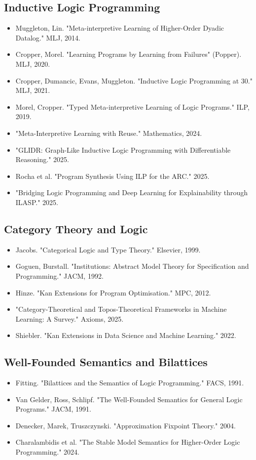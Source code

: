 \documentclass[11pt]{article}
\begin{document}
\subsection{Inductive Logic Programming}
\label{sec:orgf1f89b5}
\begin{itemize}
\item Muggleton, Lin. "Meta-interpretive Learning of Higher-Order Dyadic Datalog." MLJ, 2014.
\item Cropper, Morel. "Learning Programs by Learning from Failures" (Popper). MLJ, 2020.
\item Cropper, Dumancic, Evans, Muggleton. "Inductive Logic Programming at 30." MLJ, 2021.
\item Morel, Cropper. "Typed Meta-interpretive Learning of Logic Programs." ILP, 2019.
\item "Meta-Interpretive Learning with Reuse." Mathematics, 2024.
\item "GLIDR: Graph-Like Inductive Logic Programming with Differentiable Reasoning." 2025.
\item Rocha et al. "Program Synthesis Using ILP for the ARC." 2025.
\item "Bridging Logic Programming and Deep Learning for Explainability through ILASP." 2025.
\end{itemize}
\subsection{Category Theory and Logic}
\label{sec:orgb54bec3}
\begin{itemize}
\item Jacobs. "Categorical Logic and Type Theory." Elsevier, 1999.
\item Goguen, Burstall. "Institutions: Abstract Model Theory for Specification and Programming." JACM, 1992.
\item Hinze. "Kan Extensions for Program Optimisation." MPC, 2012.
\item "Category-Theoretical and Topos-Theoretical Frameworks in Machine Learning: A Survey." Axioms, 2025.
\item Shiebler. "Kan Extensions in Data Science and Machine Learning." 2022.
\end{itemize}
\subsection{Well-Founded Semantics and Bilattices}
\label{sec:org3809080}
\begin{itemize}
\item Fitting. "Bilattices and the Semantics of Logic Programming." FACS, 1991.
\item Van Gelder, Ross, Schlipf. "The Well-Founded Semantics for General Logic Programs." JACM, 1991.
\item Denecker, Marek, Truszczynski. "Approximation Fixpoint Theory." 2004.
\item Charalambidis et al. "The Stable Model Semantics for Higher-Order Logic Programming." 2024.
\end{itemize}
\end{document}
